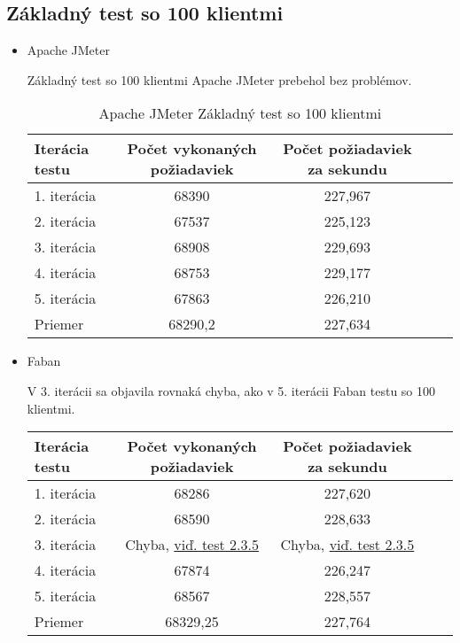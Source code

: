 \documentclass[12pt,oneside,final]{fithesis-utf8}
\begin{document}
\subsection{Základný test so 100 klientmi}

\begin{itemize}

\item Apache JMeter

Základný test so 100 klientmi Apache JMeter prebehol bez problémov.

\begin{table}[H]
\begin{center}
\begin{tabular}{ | l | c | c | c | c |}
		\hline
		 \textbf{Iterácia testu} & \textbf{Počet vykonaných požiadaviek} & \textbf{Počet požiadaviek za sekundu} \\ \hline
		 1. iterácia & 68390 & 227,967 \\ \hline
		 2. iterácia & 67537 & 225,123 \\ \hline
		 3. iterácia & 68908 & 229,693 \\ \hline
		 4. iterácia & 68753 & 229,177 \\ \hline
		 5. iterácia & 67863 & 226,210 \\ \hline
		 Priemer & 68290,2 & 227,634 \\ \hline
		 
\end{tabular}
\end{center}
\caption{Apache JMeter Základný test so 100 klientmi}
\end{table}


\item Faban

V 3. iterácii sa objavila rovnaká chyba, ako v 5. iterácii Faban testu so 100 klientmi. 

\begin{table}[H]
\begin{center}
\begin{tabular}{ | l | c | c | c | c |}
		\hline
		 \textbf{Iterácia testu} & \textbf{Počet vykonaných požiadaviek} & \textbf{Počet požiadaviek za sekundu} \\ \hline
		 1. iterácia & 68286 & 227,620 \\ \hline
		 2. iterácia & 68590 & 228,633 \\ \hline
		 3. iterácia & Chyba, \hyperlink{label}{viď. test 2.3.5} & Chyba, \hyperlink{label}{viď. test 2.3.5} \\ \hline
		 4. iterácia & 67874 & 226,247 \\ \hline
		 5. iterácia & 68567 & 228,557 \\ \hline
		 Priemer & 68329,25 & 227,764 \\ \hline
		 

\end{tabular}
\end{center}
\end{table}
\end{itemize}
\end{document}

